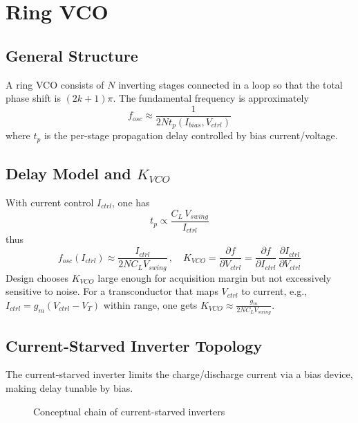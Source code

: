 \chapter{Ring VCO}
\section{General Structure}
A ring VCO consists of \(N\) inverting stages connected in a loop so that the total phase shift is \((2k+1)\pi\). The fundamental frequency is approximately
\[
f_{osc} \approx \frac{1}{2 N t_{p}(I_{bias}, V_{ctrl})}
\]
where \(t_p\) is the per-stage propagation delay controlled by bias current/voltage.

\section{Delay Model and \texorpdfstring{$K_{VCO}$}{K\_VCO}}
With current control \(I_{ctrl}\), one has
\[
t_p \propto \frac{C_L\,V_{swing}}{I_{ctrl}}
\]
thus
\[
f_{osc}(I_{ctrl}) \approx \frac{I_{ctrl}}{2 N C_L V_{swing}}\,,\quad K_{VCO} = \frac{\partial f}{\partial V_{ctrl}} = \frac{\partial f}{\partial I_{ctrl}}\,\frac{\partial I_{ctrl}}{\partial V_{ctrl}}
\]
Design chooses \(K_{VCO}\) large enough for acquisition margin but not excessively sensitive to noise. For a transconductor that maps \(V_{ctrl}\) to current, e.g., \(I_{ctrl} = g_m (V_{ctrl}-V_T)\) within range, one gets \(K_{VCO} \approx \tfrac{g_m}{2 N C_L V_{swing}}\).

\section{Current-Starved Inverter Topology}
The current-starved inverter limits the charge/discharge current via a bias device, making delay tunable by bias.
\begin{figure}[H]
  \centering
  \caption{Conceptual chain of current-starved inverters}
\end{figure}

